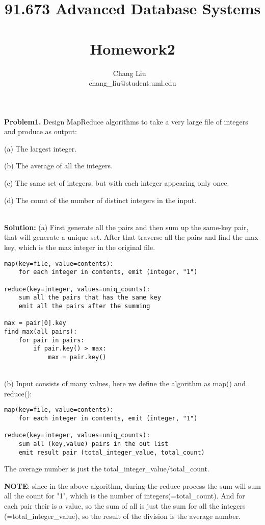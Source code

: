 \documentclass{article}
\author{Chang Liu ~\\ chang\_liu@student.uml.edu}
\title{91.673 Advanced Database Systems ~\\ Homework2}
\begin{document}
\maketitle

\noindent \textbf{Problem1.} Design MapReduce algorithms to take a very large file of integers and produce as output:

(a) The largest integer.

(b) The average of all the integers.

(c) The same set of integers, but with each integer appearing only once.

(d) The count of the number of distinct integers in the input.

~\\

\noindent \textbf{Solution:}
(a) First generate all the pairs and then sum up the same-key pair, that will generate a unique set.
After that traverse all the pairs and find the max key, which is the max integer in the original file.

\begin{lstlisting}[frame=single]
map(key=file, value=contents):
	for each integer in contents, emit (integer, "1")
	
reduce(key=integer, values=uniq_counts):
	sum all the pairs that has the same key 
	emit all the pairs after the summing
	
max = pair[0].key
find_max(all pairs):
	for pair in pairs:
		if pair.key() > max:
			max = pair.key()
\end{lstlisting}

~\\

(b) Input consists of many values, here we define the algorithm as map() and reduce():

\begin{lstlisting}[frame=single]
map(key=file, value=contents):
	for each integer in contents, emit (integer, "1")
	
reduce(key=integer, values=uniq_counts):
	sum all (key,value) pairs in the out list 
	emit result pair (total_integer_value, total_count)
\end{lstlisting}

The average number is just the total\_integer\_value/total\_count.

\textbf{NOTE}: since in the above algorithm, during the reduce process the sum will sum all the
count for "1", which is the number of integers(=total\_count). And for each pair their 
is a value, so the sum of all is just the sum for all the integers
(=total\_integer\_value), so the result of the division is the average number.
\end{document}

